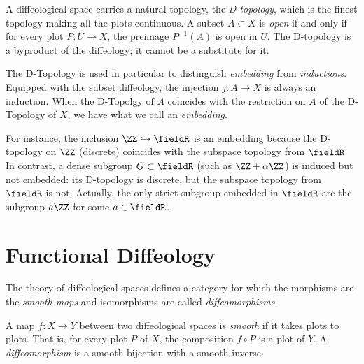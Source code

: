 \begin{article}
  A diffeological space carries a natural topology,
  the \emph{D-topology},
  which is the finest topology making all the plots continuous.
  A subset $A \subset X$ is \emph{open} if and only if for every plot $P: U \to X$,
  the preimage $P^{-1}(A)$ is open in $U$.
  The D-topology is a byproduct of the diffeology;
  it cannot be a substitute for it.
  
  The D-Topology is used in particular to distinguish \emph{embedding} from \emph{inductions}.
  Equipped with the subset diffeology,
  the injection $j: A \to X$ is always an induction.
  When the D-Topolgy of $A$ coincides with the restriction on $A$ of the D-Topology of $X$,
  we have what we call an \emph{embedding}.
  
  For instance, the inclusion $\ZZ \hookrightarrow \fieldR$ is an embedding because
  the D-topology on $\ZZ$ (discrete) coincides with the subspace topology from $\fieldR$.
  In contrast, a dense subgroup $G \subset \fieldR$ (such as $\ZZ + \alpha\ZZ$) is
  induced but not embedded: its D-topology is discrete, but the subspace topology
  from $\fieldR$ is not.
  Actually,
  the only strict subgroup embedded in $\fieldR$ are the subgroup $a\ZZ$ for some $a \in \fieldR$.
\end{article}

\section{Functional Diffeology}
\label{sec:Functional Diffeology}

The theory of diffeological spaces defines a category for which the morphisms are the \emph{smooth maps} and isomorphisms are called \emph{diffeomorphisms}.

\begin{article}
  A map $f: X \to Y$ between two diffeological spaces is \emph{smooth} if it takes plots to plots.
  That is,
  for every plot $P$ of $X$,
  the composition $f \circ P$ is a plot of $Y$.
  A \emph{diffeomorphism} is a smooth bijection with a smooth inverse.
\end{article}

